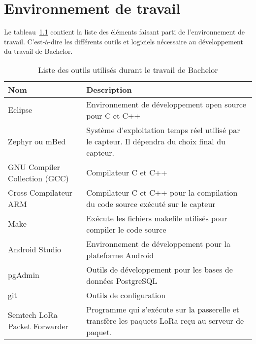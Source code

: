 \chapter{Environnement de travail}

Le tableau~\ref{tab:env_travail} contient la liste des éléments faisant parti de l’environnement de travail. C’est-à-dire les différents outils et logiciels nécessaire au développement du travail de Bachelor.

\begin{table}[htb]
\caption[Environnement de travail]{Liste des outils utilisés durant le travail de Bachelor}
\label{tab:env_travail}
\centering
\begin{tabular}{lp{8cm}}
\toprule
Nom & Description \\
\midrule
Eclipse &	Environnement de développement open source pour C et C++\\
Zephyr ou mBed & Système d’exploitation temps réel utilisé par le capteur. Il dépendra du choix final du capteur.\\
GNU Compiler Collection (GCC) & Compilateur C et C++\\
Cross Compilateur ARM & Compilateur C et C++ pour la compilation du code source exécuté sur le capteur\\
Make & Exécute les fichiers makefile utilisés pour compiler le code source\\
Android Studio & Environnement de développement pour la plateforme Android\\
pgAdmin & Outils de développement pour les bases de données PostgreSQL\\
git	 & Outils de configuration\\
Semtech LoRa Packet Forwarder & Programme qui s’exécute sur la passerelle et transfère les paquets LoRa reçu au serveur de paquet. \\
\bottomrule 
\end{tabular}
\end{table}